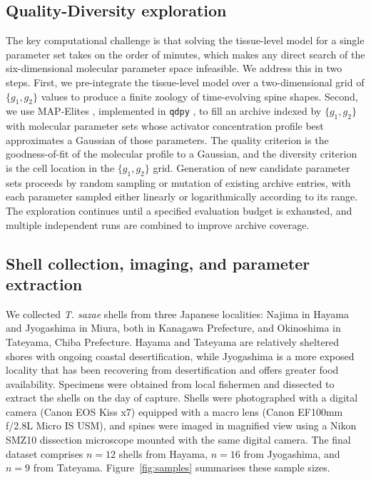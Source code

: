 \documentclass[11pt]{article}
\begin{document}
\subsection{Quality-Diversity exploration}

The key computational challenge is that solving the tissue-level model for
a single parameter set takes on the order of minutes, which makes any
direct search of the six-dimensional molecular parameter space infeasible.
We address this in two steps. First, we pre-integrate the tissue-level
model over a two-dimensional grid of $\{g_1, g_2\}$ values to produce a
finite zoology of time-evolving spine shapes. Second, we use MAP-Elites
\citep{mouret2015illuminating,cully2015robots}, implemented in \texttt{qdpy}
\citep{cazenille2018qdpy}, to fill an archive indexed by $\{g_1, g_2\}$
with molecular parameter sets whose activator concentration profile best
approximates a Gaussian of those parameters. The quality criterion is the
goodness-of-fit of the molecular profile to a Gaussian, and the diversity
criterion is the cell location in the $\{g_1, g_2\}$ grid. Generation of
new candidate parameter sets proceeds by random sampling or mutation of
existing archive entries, with each parameter sampled either linearly or
logarithmically according to its range. The exploration continues until a
specified evaluation budget is exhausted, and multiple independent runs
are combined to improve archive coverage.

\subsection{Shell collection, imaging, and parameter extraction}

We collected \textit{T. sazae} shells from three Japanese localities: Najima
in Hayama and Jyogashima in Miura, both in Kanagawa Prefecture, and
Okinoshima in Tateyama, Chiba Prefecture. Hayama and Tateyama are
relatively sheltered shores with ongoing coastal desertification, while
Jyogashima is a more exposed locality that has been recovering from
desertification and offers greater food availability. Specimens were
obtained from local fishermen and dissected to extract the shells on the
day of capture. Shells were photographed with a digital camera (Canon EOS
Kiss x7) equipped with a macro lens (Canon EF100mm f/2.8L Micro IS USM),
and spines were imaged in magnified view using a Nikon SMZ10 dissection
microscope mounted with the same digital camera. The final dataset
comprises $n=12$ shells from Hayama, $n=16$ from Jyogashima, and $n=9$
from Tateyama. Figure~\ref{fig:samples} summarises these sample sizes.
\end{document}
